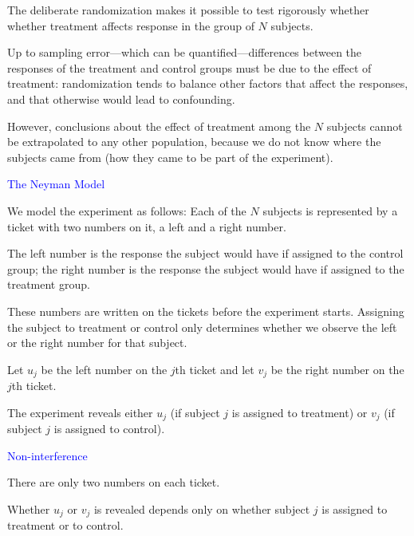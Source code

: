 \documentclass[landscape]{slides}
\begin{document}
\begin{slide}
\begin{slide}
    The deliberate randomization makes it possible to test rigorously whether
    whether treatment affects response in the group of $N$ subjects.
    
   Up to sampling error---which can be quantified---differences between the responses
    of the treatment and control groups must be due to the effect of treatment: 
    randomization tends to balance other factors that affect the responses, and that
    otherwise would lead to confounding.
    
    However, conclusions about the effect of treatment among the $N$ subjects
    cannot be extrapolated to any other population, because we do not know where the
    subjects came from (how they came to be part of the experiment).


\end{slide}

\begin{slide}
{\textcolor{blue}{The Neyman Model}}

    We model the experiment as follows: Each of the $N$ subjects is represented by
    a ticket with two numbers on it, a left and a right number.
    
    The left number is the response the subject would have if assigned to the control group;
    the right number is the response the subject would have if assigned to the treatment group.
    
    These numbers are written on the tickets before the experiment starts.
    Assigning the subject to treatment or control only determines whether we observe the left
    or the right number for that subject.
    
    Let $u_j$ be the left number on the $j$th ticket and
    let $v_j$ be the right number on the $j$th ticket.
    
    The experiment reveals either $u_j$ (if subject $j$ is assigned to treatment) or $v_j$
    (if subject $j$ is assigned to control).

\end{slide}

\begin{slide}
{\textcolor{blue}{Non-interference}}

   There are only two numbers on each ticket.
   
   Whether $u_j$ or $v_j$ is revealed depends only on whether subject $j$ is assigned
   to treatment or to control.
   

\end{slide}
\end{slide}
\end{document}
